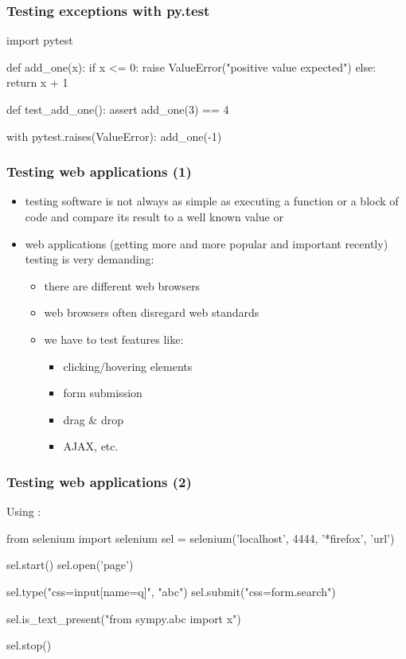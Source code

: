 \documentclass{beamer}
\begin{document}
\begin{frame}[fragile]
    \frametitle{Testing exceptions with py.test}

    \begin{python}
import pytest

def add_one(x):
    if x <= 0:
        raise ValueError("positive value expected")
    else:
        return x + 1

def test_add_one():
    assert add_one(3) == 4

    with pytest.raises(ValueError):
        add_one(-1)
    \end{python}
\end{frame}

\begin{frame}[fragile]
    \frametitle{Testing web applications (1)}

    \begin{itemize}
        \item testing software is not always as simple as executing a function
        or a block of code and compare its result to a well known value or
        \item web applications (getting more and more popular and important
        recently) testing is very demanding:
            \pause
            \begin{itemize}
                \item there are different web browsers
                \item web browsers often disregard web standards
                \item we have to test features like:
                    \pause
                    \begin{itemize}
                        \item clicking/hovering elements
                        \item form submission
                        \item drag \& drop
                        \item AJAX, etc.
                    \end{itemize}
            \end{itemize}
    \end{itemize}
\end{frame}

\begin{frame}[fragile]
    \frametitle{Testing web applications (2)}

    Using :
    \begin{python}
from selenium import selenium
sel = selenium('localhost', 4444, '*firefox', 'url')

sel.start()
sel.open('page')

sel.type("css=input[name=q]", "abc")
sel.submit("css=form.search")

sel.is_text_present("from sympy.abc import x")

sel.stop()
    \end{python}
\end{frame}
\end{document}
